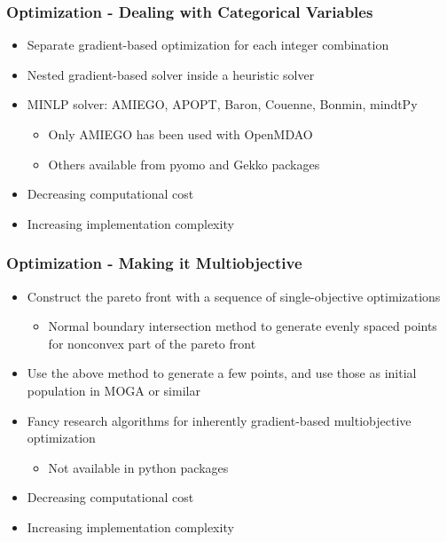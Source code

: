 \begin{frame}
	\frametitle{Optimization - Dealing with Categorical Variables}
	\begin{itemize}
		\item Separate gradient-based optimization for each integer combination
		\item Nested gradient-based solver inside a heuristic solver
		\item MINLP solver: AMIEGO, APOPT, Baron, Couenne, Bonmin, mindtPy
		      \begin{itemize}
		      	\item Only AMIEGO has been used with OpenMDAO
		      	\item Others available from pyomo and Gekko packages
		      \end{itemize}
		      
		\item Decreasing computational cost
		\item Increasing implementation complexity
	\end{itemize}
	
\end{frame}


\begin{frame}
	\frametitle{Optimization - Making it Multiobjective}
	\begin{itemize}
		\item Construct the pareto front with a sequence of single-objective optimizations
		      \begin{itemize}
		      	\item Normal boundary intersection method to generate evenly spaced points for nonconvex part of the pareto front
		      \end{itemize}
		\item Use the above method to generate a few points, and use those as initial population in MOGA or similar
		\item Fancy research algorithms for inherently gradient-based multiobjective optimization
		      \begin{itemize}
		      	\item Not available in python packages
		      \end{itemize}
		      
		\item Decreasing computational cost
		\item Increasing implementation complexity
	\end{itemize}
	
\end{frame}


